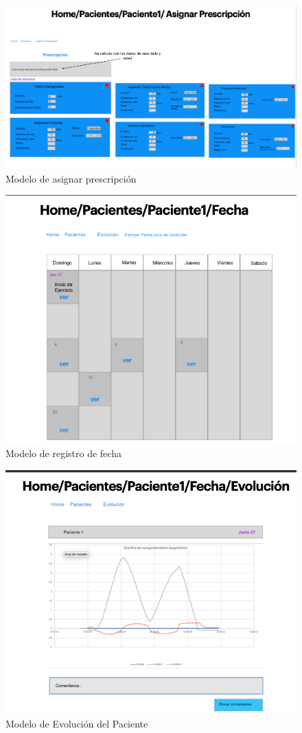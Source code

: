 \documentclass[12pt]{article}
\begin{document}
\begin{figure}[ht]
\centering
\includegraphics[scale=0.4]{imag/P7.png}
\caption{Modelo de asignar prescripción }
\label{6}
\end{figure}
\FloatBarrier


\begin{figure}[ht]
\centering
\includegraphics[scale=0.35]{imag/P8.png}
\caption{Modelo de registro de fecha }
\label{6}
\end{figure}
\FloatBarrier


\begin{figure}[ht]
\centering
\includegraphics[scale=0.4]{imag/P9.png}
\caption{Modelo de Evolución del Paciente }
\label{6}
\end{figure}
\FloatBarrier
\end{document}
